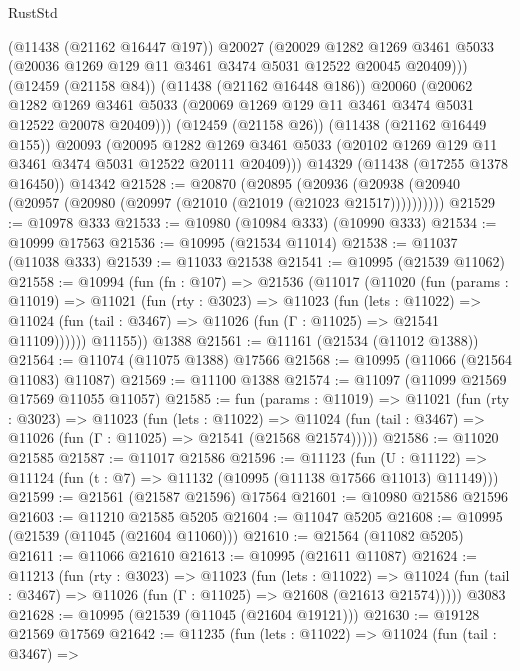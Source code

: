 \begin{lexlean}{RustStd}
\begin{coremodule}
          (@11438 (@21162 @16447 @197))
          @20027
          (@20029
            @1282
            @1269
            @3461
            @5033
            (@20036 @1269 @129 @11 @3461 @3474 @5031 @12522 @20045 @20409)))
        (@12459 (@21158 @84))
        (@11438 (@21162 @16448 @186))
        @20060
        (@20062
          @1282
          @1269
          @3461
          @5033
          (@20069 @1269 @129 @11 @3461 @3474 @5031 @12522 @20078 @20409)))
      (@12459 (@21158 @26))
      (@11438 (@21162 @16449 @155))
      @20093
      (@20095
        @1282
        @1269
        @3461
        @5033
        (@20102 @1269 @129 @11 @3461 @3474 @5031 @12522 @20111 @20409)))
    @14329
    (@11438 (@17255 @1378 @16450))
    @14342
@21528 := @20870
    (@20895 (@20936 (@20938 (@20940 (@20957 (@20980 (@20997 (@21010 (@21019 (@21023 @21517))))))))))
@21529 := @10978 @333
@21533 := @10980 (@10984 @333) (@10990 @333)
@21534 := @10999 @17563
@21536 := @10995 (@21534 @11014)
@21538 := @11037 (@11038 @333)
@21539 := @11033 @21538
@21541 := @10995 (@21539 @11062)
@21558 := @10994
    (fun (fn : @107) =>
    @21536
      (@11017
        (@11020
          (fun (params : @11019) =>
          @11021
            (fun (rty : @3023) =>
            @11023
              (fun (lets : @11022) =>
              @11024 (fun (tail : @3467) => @11026 (fun (Γ : @11025) => @21541 @11109))))))
        @11155))
    @1388
@21561 := @11161 (@21534 (@11012 @1388))
@21564 := @11074 (@11075 @1388) @17566
@21568 := @10995 (@11066 (@21564 @11083) @11087)
@21569 := @11100 @1388
@21574 := @11097 (@11099 @21569 @17569 @11055 @11057)
@21585 := fun (params : @11019) =>
  @11021
    (fun (rty : @3023) =>
    @11023
      (fun (lets : @11022) =>
      @11024 (fun (tail : @3467) => @11026 (fun (Γ : @11025) => @21541 (@21568 @21574)))))
@21586 := @11020 @21585
@21587 := @11017 @21586
@21596 := @11123
    (fun (U : @11122) => @11124 (fun (t : @7) => @11132 (@10995 (@11138 @17566 @11013) @11149)))
@21599 := @21561 (@21587 @21596) @17564
@21601 := @10980 @21586 @21596
@21603 := @11210 @21585 @5205
@21604 := @11047 @5205
@21608 := @10995 (@21539 (@11045 (@21604 @11060)))
@21610 := @21564 (@11082 @5205)
@21611 := @11066 @21610
@21613 := @10995 (@21611 @11087)
@21624 := @11213
    (fun (rty : @3023) =>
    @11023
      (fun (lets : @11022) =>
      @11024 (fun (tail : @3467) => @11026 (fun (Γ : @11025) => @21608 (@21613 @21574)))))
    @3083
@21628 := @10995 (@21539 (@11045 (@21604 @19121)))
@21630 := @19128 @21569 @17569
@21642 := @11235
    (fun (lets : @11022) =>
    @11024
      (fun (tail : @3467) =>

\end{coremodule}
\end{lexlean}
